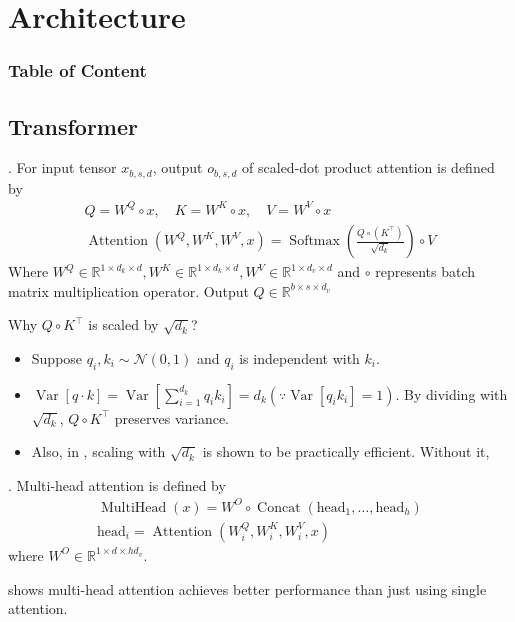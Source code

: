 \documentclass[8pt]{beamer}
\newcommand{\mbb}[1]{\mathbb{#1}}
\newcommand{\mc}[1]{\mathcal{#1}}
\newcommand{\Var}[1]{\operatorname{Var}\left[#1\right]}
\newcommand{\Softmax}[1]{\operatorname{Softmax}\!\left(#1\right)}
\newcommand{\Attention}[1]{\operatorname{Attention}\!\left(#1\right)}
\newcommand{\Concat}[1]{\operatorname{Concat}\!\left(#1\right)}
\begin{document}
\section{Architecture}
\begingroup
    \begin{frame}
        \begin{multicols}{2}
            \frametitle{Table of Content}
            \tableofcontents
        \end{multicols}
    \end{frame}
\endgroup
\subsection{Transformer}


\begin{frame}{.}
    For input tensor $x_{b,s,d}$, output $o_{b,s,d}$ of scaled-dot product attention is defined by 
    \[
    \begin{gathered}
        Q = W^Q \circ x, \quad K = W^K \circ x,\quad V = W^V \circ x \\
        \Attention{W^Q, W^K, W^V, x} = \Softmax{\frac{Q \circ (K^\top)}{\sqrt{d_k}}} \circ V
    \end{gathered}
    \]
    Where $W^Q \in \mbb{R}^{1 \times d_k \times d}, W^K \in \mbb{R}^{1 \times d_k \times d}, W^V \in \mbb{R}^{1\times d_v \times d}$ and $\circ$ represents batch matrix multiplication operator. Output $Q \in \mbb{R}^{b\times s \times d_v}$

    \bigskip
    Why $Q \circ K^\top$ is scaled by $\sqrt{d_k}$?
    \begin{itemize}
        \item Suppose $q_i, k_i \sim \mc{N}(0,1)$ and $q_i$ is independent with $k_i$.
        \item $\Var{q \cdot k} = \Var{\sum_{i=1}^{d_k} q_i k_i} = d_k (\because \Var{q_i k_i}=1)$. By dividing with $\sqrt{d_k}$, $Q\circ K^\top$ preserves variance.
        \item Also, in \cite{vaswani2017attention}, scaling with $\sqrt{d_k}$ is shown to be practically efficient. Without it, 
    \end{itemize}
\end{frame}

\begin{frame}{.}
    Multi-head attention is defined by 
    \[
    \begin{gathered}
        \operatorname{MultiHead}(x) = W^O \circ \Concat{\text{head}_1, \dots, \text{head}_h} \\
        \text{head}_i = \Attention{W^Q_i, W^K_i, W^V_i, x}
    \end{gathered}
    \]
    where $W^O \in \mbb{R}^{1 \times d\times hd_v}$.

    \cite{vaswani2017attention} shows multi-head attention achieves better performance than just using single attention.
\end{frame}
\end{document}
